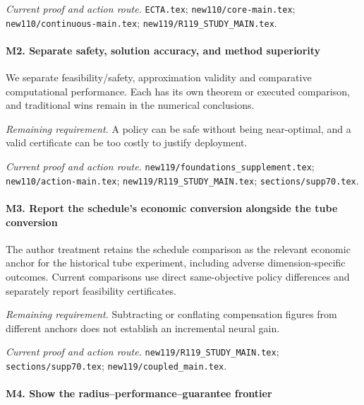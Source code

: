 \par\emph{Current proof and action route.} \nolinkurl{ECTA.tex}; \nolinkurl{new110/core-main.tex}; \nolinkurl{new110/continuous-main.tex}; \nolinkurl{new119/R119_STUDY_MAIN.tex}.

\paragraph{M2. Separate safety, solution accuracy, and method superiority}

We separate feasibility/\allowbreak{}safety, approximation validity and comparative computational performance. Each has its own theorem or executed comparison, and traditional wins remain in the numerical conclusions.

\par\emph{Remaining requirement.} A policy can be safe without being near-optimal, and a valid certificate can be too costly to justify deployment.

\par\emph{Current proof and action route.} \nolinkurl{new119/foundations_supplement.tex}; \nolinkurl{new110/action-main.tex}; \nolinkurl{new119/R119_STUDY_MAIN.tex}; \nolinkurl{sections/supp70.tex}.

\paragraph{M3. Report the schedule's economic conversion alongside the tube conversion}

The author treatment retains the schedule comparison as the relevant economic anchor for the historical tube experiment, including adverse dimension-specific outcomes. Current comparisons use direct same-objective policy differences and separately report feasibility certificates.

\par\emph{Remaining requirement.} Subtracting or conflating compensation figures from different anchors does not establish an incremental neural gain.

\par\emph{Current proof and action route.} \nolinkurl{new119/R119_STUDY_MAIN.tex}; \nolinkurl{sections/supp70.tex}; \nolinkurl{new119/coupled_main.tex}.

\paragraph{M4. Show the radius--performance--guarantee frontier}

